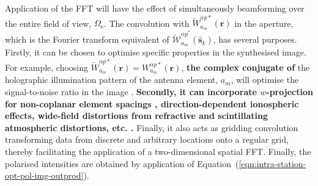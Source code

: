 \documentclass[
  journal=pasa,
  manuscript=article-type,
  year=2020,
  volume=37,
]{cup-journal}
\begin{document}
Application of the FFT will have the effect of simultaneously beamforming over the entire field of view, $\Omega_\textrm{e}$. The convolution with $\widetilde{W}_{a_m}^{\alpha p*}(\boldsymbol{r})$ in the aperture, which is the Fourier transform equivalent of $\widetilde{\mathcal{W}}_{a_m}^{{\alpha p}^*}(\hat{\boldsymbol{s}}_k)$, has several purposes. Firstly, it can be chosen to optimise specific properties in the synthesised image. For example, choosing $\widetilde{W}_{a_m}^{\alpha p*}(\boldsymbol{r})=W_{a_m}^{\alpha p*}(\boldsymbol{r})$, \textbf{the complex conjugate of} the holographic illumination pattern of the antenna element, $a_m$, will optimise the signal-to-noise ratio in the image \citep{Morales2011}. \textbf{Secondly, it can incorporate $w$-projection for non-coplanar element spacings \citep{Cornwell+2008}, direction-dependent ionospheric effects, wide-field distortions from refractive and scintillating atmospheric distortions, etc. \citep{Morales+2009,Morales2011}.} Finally, it also acts as gridding convolution transforming data from discrete and arbitrary locations onto a regular grid, thereby facilitating the application of a two-dimensional spatial FFT. Finally, the polarised intensities are obtained by application of Equation~(\ref{eqn:intra-station-opt-pol-img-outprod}).

\end{document}
